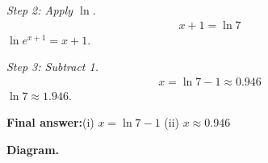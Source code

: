 \documentclass[11pt]{article}
\begin{document}
\textit{Step 2: Apply \( \ln \).}
\[\begin{gathered}
x + 1 = \ln 7
\end{gathered}\]
\( \ln e^{x+1} = x+1 \).

\textit{Step 3: Subtract 1.}
\[\begin{gathered}
x = \ln 7 - 1 \approx 0.946
\end{gathered}\]
\( \ln 7 \approx 1.946 \).

\begin{answerbox}
\textbf{Final answer:}\quad (i) \(\displaystyle  x = \ln 7 - 1 \) \quad  (ii) \(\displaystyle  x \approx 0.946 \)
\end{answerbox}
\textbf{Diagram.}

\begin{center}
\end{center}
\end{document}
